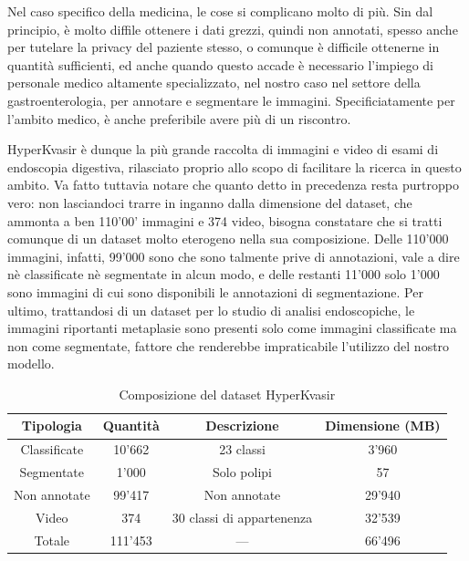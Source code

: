 Nel caso specifico della medicina, le cose si complicano
molto di più.
Sin dal principio, è molto diffile ottenere i dati grezzi,
quindi non annotati, spesso anche per tutelare la privacy
del paziente stesso, o comunque è difficile ottenerne in
quantità sufficienti, ed anche quando questo accade
è necessario l'impiego di personale medico altamente
specializzato, nel nostro caso nel settore della
gastroenterologia, per annotare e segmentare le immagini.
Specificiatamente per l'ambito medico, è anche preferibile
avere più di un riscontro.

HyperKvasir è dunque la più grande raccolta di immagini
e video di esami di endoscopia digestiva, rilasciato proprio
allo scopo di facilitare la ricerca in questo ambito.
Va fatto tuttavia notare che quanto detto in precedenza resta
purtroppo vero:
non lasciandoci trarre in inganno dalla dimensione del dataset,
che ammonta a ben 110'00' immagini e 374 video, bisogna
constatare che si tratti comunque di un dataset molto
eterogeno nella sua composizione.
Delle 110'000 immagini, infatti, 99'000 sono che sono
talmente prive di annotazioni, vale a dire nè classificate
nè segmentate in alcun modo, e delle restanti 11'000
solo 1'000 sono immagini di cui sono disponibili
le annotazioni di segmentazione.
Per ultimo, trattandosi di un dataset per lo studio
di analisi endoscopiche, le immagini riportanti metaplasie
sono presenti solo come immagini classificate ma non come
segmentate, fattore che renderebbe impraticabile
l'utilizzo del nostro modello.

\begin{table}
    \center
    \begin{tabular}{||c|c|c|c||}
        \hline
        Tipologia & Quantità & Descrizione & Dimensione (MB) \\
        \hline
        \hline
        Classificate & 10'662 & 23 classi & 3'960 \\
        \hline
        Segmentate & 1'000 & Solo polipi & 57 \\
        \hline
        Non annotate & 99'417 & Non annotate & 29'940 \\
        \hline
        Video & 374 & 30 classi di appartenenza & 32'539 \\
        \hline
        \hline
        Totale & 111'453 & --- & 66'496 \\
        \hline
    \end{tabular}
    \caption{\label{tab:hyperkvasir}Composizione del dataset HyperKvasir}
\end{table}

